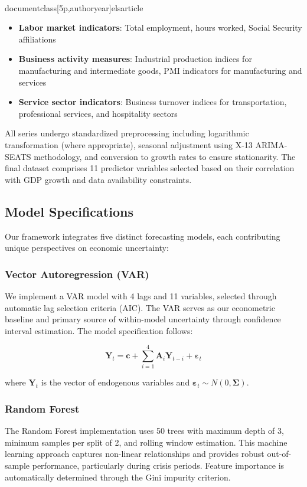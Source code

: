\\documentclass[5p,authoryear]{elsarticle}
\begin{document}
{\begin{itemize}
    \item \textbf{Labor market indicators}: Total employment, hours worked, Social Security affiliations
    \item \textbf{Business activity measures}: Industrial production indices for manufacturing and intermediate goods, PMI indicators for manufacturing and services
    \item \textbf{Service sector indicators}: Business turnover indices for transportation, professional services, and hospitality sectors
\end{itemize}

All series undergo standardized preprocessing including logarithmic transformation (where appropriate), seasonal adjustment using X-13 ARIMA-SEATS methodology, and conversion to growth rates to ensure stationarity. The final dataset comprises 11 predictor variables selected based on their correlation with GDP growth and data availability constraints.

\subsection{Model Specifications}

Our framework integrates five distinct forecasting models, each contributing unique perspectives on economic uncertainty:

\subsubsection{Vector Autoregression (VAR)}
We implement a VAR model with 4 lags and 11 variables, selected through automatic lag selection criteria (AIC). The VAR serves as our econometric baseline and primary source of within-model uncertainty through confidence interval estimation. The model specification follows:

$$\mathbf{Y}_t = \mathbf{c} + \sum_{i=1}^{4} \mathbf{A}_i \mathbf{Y}_{t-i} + \boldsymbol{\varepsilon}_t$$

where $\mathbf{Y}_t$ is the vector of endogenous variables and $\boldsymbol{\varepsilon}_t \sim N(0, \boldsymbol{\Sigma})$.

\subsubsection{Random Forest}
The Random Forest implementation uses 50 trees with maximum depth of 3, minimum samples per split of 2, and rolling window estimation. This machine learning approach captures non-linear relationships and provides robust out-of-sample performance, particularly during crisis periods. Feature importance is automatically determined through the Gini impurity criterion.

}
\end{document}
